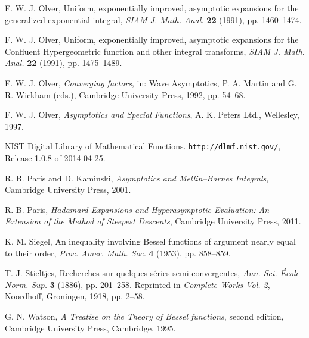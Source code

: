 \documentclass[a4paper,twoside,10pt]{amsart}
\numberwithin{equation}{section}
\begin{document}
\begin{thebibliography}{10}
F. W. J. Olver, Uniform, exponentially improved, asymptotic expansions for the generalized exponential integral, \emph{SIAM J. Math. Anal.} \textbf{22} (1991), pp. 1460--1474.

F. W. J. Olver, Uniform, exponentially improved, asymptotic expansions for the Confluent Hypergeometric function and other integral transforms, \emph{SIAM J. Math. Anal.} \textbf{22} (1991), pp. 1475--1489.

F. W. J. Olver, \emph{Converging factors}, in: Wave Asymptotics, P. A. Martin and G. R. Wickham (eds.), Cambridge University Press, 1992, pp. 54--68.

F. W. J. Olver, \emph{Asymptotics and Special Functions}, A. K. Peters Ltd., Wellesley, 1997.

NIST Digital Library of Mathematical Functions. \texttt{http://dlmf.nist.gov/}, Release 1.0.8 of 2014-04-25.

R. B. Paris and D. Kaminski, \emph{Asymptotics and Mellin--Barnes Integrals}, Cambridge University Press, 2001.

R. B. Paris, \emph{Hadamard Expansions and Hyperasymptotic Evaluation: An Extension of the Method of Steepest Descents},
Cambridge University Press, 2011.

K. M. Siegel, An inequality involving Bessel functions of argument nearly equal to their order, \emph{Proc. Amer. Math. Soc.} \textbf{4} (1953), pp. 858--859.

T. J. Stieltjes, Recherches sur quelques séries semi-convergentes, \emph{Ann. Sci. École Norm. Sup.} \textbf{3} (1886), pp. 201--258. Reprinted in \emph{Complete Works Vol. 2}, Noordhoff, Groningen, 1918, pp. 2--58.

G. N. Watson, \emph{A Treatise on the Theory of Bessel functions}, second edition, Cambridge University Press, Cambridge, 1995.

\end{thebibliography}
\end{document}
